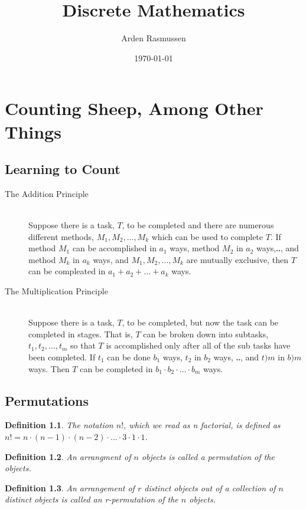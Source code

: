 \documentclass{report}
\title{Discrete Mathematics}
\author{Arden Rasmussen}
\date{\today}
\newtheorem{definition}{Definition}[section]
\begin{document}
\chapter{Counting Sheep, Among Other Things}
\label{cha:counting_sheep_among_other_things}

\section{Learning to Count}
\label{sec:learning_to_count}

\begin{description}
  \item[The Addition Principle] \hfill \\
    Suppose there is a task, $T$, to be completed and there are numerous
    different methods, $M_1, M_2, \dots,M_k$ which can be used to complete
    $T$. If method $M_1$ can be accomplished in $a_1$ ways, method $M_2$ in
    $a_2$ ways,‥, and method $M_k$ in $a_k$ ways, and $M_1, M_2,\dots,M_k$
    are mutually exclusive, then $T$ can be compleated in $a_1+a_2+\dots+a_k$
    ways.

  \item[The Multiplication Principle] \hfill \\
    Suppose there is a task, $T$,  to be completed, but now the task can be
    completed in stages. That is, $T$ can be broken down into subtasks,
    $t_1,t_2,\dots,t_m$ so that $T$ is accomplished only after all of the sub
    tasks have been completed. If $t_1$ can be done $b_1$ ways, $t_2$ in $b_2$
    ways, ‥, and $t)m$ in $b)m$ ways. Then $T$ can be completed in $b_1 \cdot
    b_2 \cdot \dots \cdot b_m$ ways.
\end{description}

\section{Permutations}
\label{sec:permutations}

\begin{definition}
  The notation $n!$, which we read as \textit{n factorial}, is defined as $n! =
  n\cdot(n-1)\cdot(n-2)\cdot \dots \cdot 3 \cdot 1 \cdot 1$.
\end{definition}

\begin{definition}
  An arrangment of $n$ objects is called a \textit{permutation} of the objects.
\end{definition}

\begin{definition}
   An arrangement of $r$ distinct objects out of a collection of $n$ distinct
   objects is called an \textit{r-permutation} of the $n$ objects.
\end{definition}
\end{document}
